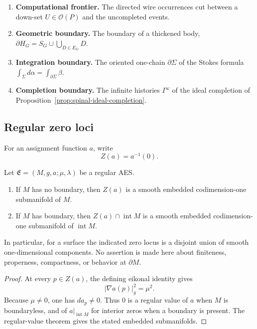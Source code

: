 \begin{convention}
\label{conv:four-boundaries-distinction}
\begin{enumerate}
  \item \textbf{Computational frontier.} The directed wire occurrences cut
  between a down-set $U\in\mathcal O(P)$ and the uncompleted events.
  \item \textbf{Geometric boundary.} The boundary of a thickened body,
  $\partial H_G=S_G\cup\bigcup_{D\in E_G}D$.
  \item \textbf{Integration boundary.} The oriented one-chain $\partial\Sigma$
  of the Stokes formula $\int_\Sigma d\alpha=\int_{\partial\Sigma}\beta$.
  \item \textbf{Completion boundary.} The infinite histories $\Gamma^\omega$ of
  the ideal completion of
  Proposition~\ref{prop:spinal-ideal-completion}.
\end{enumerate}
\end{convention}

\subsection{Regular zero loci}

For an assignment function \(a\), write
\[
 Z(a)=a^{-1}(0).
\]

\begin{theorem}\label{thm:regular-zero-locus}
Let \(\mathfrak E=(M,g,a;\mu,\lambda)\) be a regular AES.
\begin{enumerate}
\item If \(M\) has no boundary, then \(Z(a)\) is a smooth embedded
      codimension-one submanifold of \(M\).
\item If \(M\) has boundary, then
      \(Z(a)\cap\operatorname{int}M\) is a smooth embedded
      codimension-one submanifold of \(\operatorname{int}M\).
\end{enumerate}
In particular, for a surface the indicated zero locus is a disjoint union of
smooth one-dimensional components.  No assertion is made here about finiteness,
properness, compactness, or behavior at \(\partial M\).
\end{theorem}

\begin{proof}
At every \(p\in Z(a)\), the defining eikonal identity gives
\[
 |\nabla a(p)|_g^2=\mu^2.
\]
Because \(\mu\ne0\), one has \(da_p\ne0\).  Thus \(0\) is a regular value of
\(a\) when \(M\) is boundaryless, and of
\(a|_{\operatorname{int}M}\) for interior zeros when a boundary is present.
The regular-value theorem gives the stated embedded submanifolds.
\end{proof}

